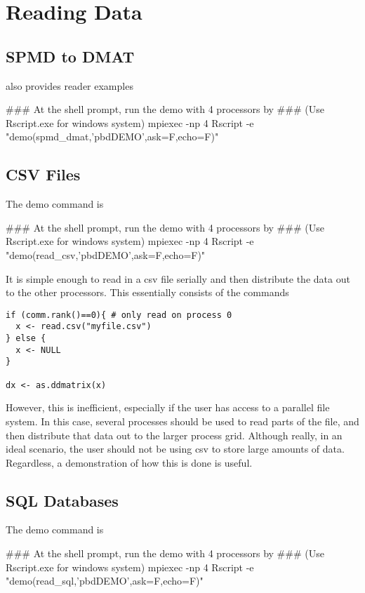 \section{Reading Data}
\label{sec:reader}





\subsection{SPMD to DMAT}
\label{sec:spmd2dmat}

 also provides reader examples
\begin{Command}
### At the shell prompt, run the demo with 4 processors by
### (Use Rscript.exe for windows system)
mpiexec -np 4 Rscript -e "demo(spmd_dmat,'pbdDEMO',ask=F,echo=F)"
\end{Command}







\subsection{CSV Files}
\label{sec:csv_files}

The demo command is
\begin{Command}
### At the shell prompt, run the demo with 4 processors by
### (Use Rscript.exe for windows system)
mpiexec -np 4 Rscript -e "demo(read_csv,'pbdDEMO',ask=F,echo=F)"
\end{Command}

It is simple enough to read in a csv file serially and then distribute the data out to the other processors.  This essentially consists of the commands

\begin{lstlisting}[language=rr]
if (comm.rank()==0){ # only read on process 0
  x <- read.csv("myfile.csv")
} else {
  x <- NULL
}

dx <- as.ddmatrix(x)
\end{lstlisting}

However, this is inefficient, especially if the user has access to a parallel file system.  In this case, several processes should be used to read parts of the file, and then distribute that data out to the larger process grid.  Although really, in an ideal scenario, the user should not be using csv to store large amounts of data.  Regardless, a demonstration of how this is done is useful.


\subsection{SQL Databases}
\label{sec:sql_db}


The demo command is
\begin{Command}
### At the shell prompt, run the demo with 4 processors by
### (Use Rscript.exe for windows system)
mpiexec -np 4 Rscript -e "demo(read_sql,'pbdDEMO',ask=F,echo=F)"
\end{Command}
